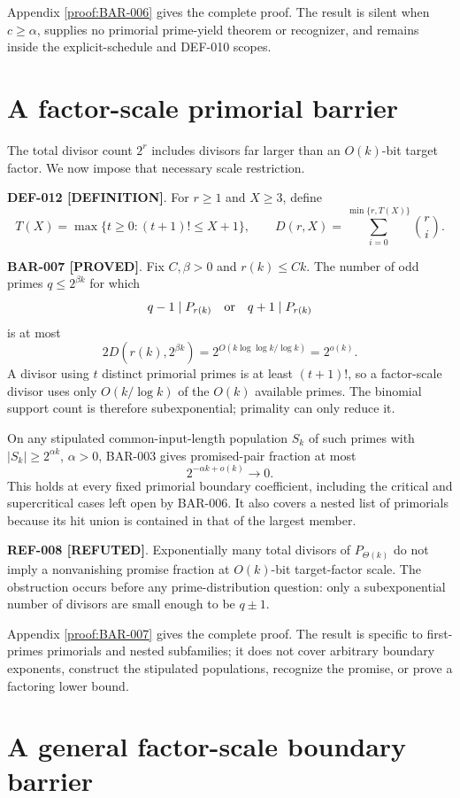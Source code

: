 \documentclass[11pt]{article}
\newcommand{\claimstatus}[2]{\textbf{#1 [#2]}}
\begin{document}
Appendix \ref{proof:BAR-006} gives the complete proof. The result is silent
when \(c\ge\alpha\), supplies no primorial prime-yield theorem or recognizer,
and remains inside the explicit-schedule and DEF-010 scopes.

\section{A factor-scale primorial barrier}

The total divisor count \(2^r\) includes divisors far larger than an
\(O(k)\)-bit target factor. We now impose that necessary scale restriction.

\claimstatus{DEF-012}{DEFINITION}. For \(r\ge1\) and \(X\ge3\), define
\[
T(X)=\max\{t\ge0:(t+1)!\le X+1\},\qquad
D(r,X)=\sum_{i=0}^{\min\{r,T(X)\}}\binom ri .
\]

\claimstatus{BAR-007}{PROVED}. Fix \(C,\beta>0\) and \(r(k)\le Ck\). The
number of odd primes \(q\le2^{\beta k}\) for which
\[
q-1\mid P_{r(k)}\quad\hbox{or}\quad q+1\mid P_{r(k)}
\]
is at most
\[
2D(r(k),2^{\beta k})
=2^{O(k\log\log k/\log k)}
=2^{o(k)}.
\]
A divisor using \(t\) distinct primorial primes is at least \((t+1)!\), so a
factor-scale divisor uses only \(O(k/\log k)\) of the \(O(k)\) available
primes. The binomial support count is therefore subexponential; primality can
only reduce it.

On any stipulated common-input-length population \(S_k\) of such primes with
\(|S_k|\ge2^{\alpha k}\), \(\alpha>0\), BAR-003 gives promised-pair fraction
at most
\[
2^{-\alpha k+o(k)}\longrightarrow0.
\]
This holds at every fixed primorial boundary coefficient, including the
critical and supercritical cases left open by BAR-006. It also covers a
nested list of primorials because its hit union is contained in that of the
largest member.

\claimstatus{REF-008}{REFUTED}. Exponentially many total divisors of
\(P_{\Theta(k)}\) do not imply a nonvanishing promise fraction at
\(O(k)\)-bit target-factor scale. The obstruction occurs before any
prime-distribution question: only a subexponential number of divisors are
small enough to be \(q\pm1\).

Appendix \ref{proof:BAR-007} gives the complete proof. The result is specific
to first-primes primorials and nested subfamilies; it does not cover arbitrary
boundary exponents, construct the stipulated populations, recognize the
promise, or prove a factoring lower bound.

\section{A general factor-scale boundary barrier}
\end{document}
